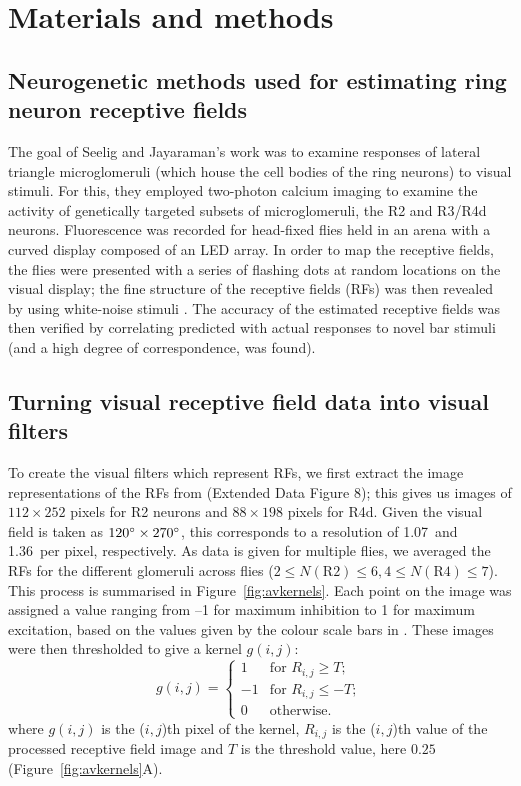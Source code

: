\section*{Materials and methods}
\subsection*{Neurogenetic methods used for estimating ring neuron receptive fields}
\label{sec:methods:seelig}
The goal of Seelig and Jayaraman's \cite{Seelig2013} work was to examine responses of lateral triangle microglomeruli (which house the cell bodies of the ring neurons) to visual stimuli.
For this, they employed two-photon calcium imaging to examine the activity of genetically targeted subsets of microglomeruli, the R2 and R3/R4d neurons.
Fluorescence was recorded for head-fixed flies held in an arena with a curved display composed of an LED array.
In order to map the receptive fields, the flies were presented with a series of flashing dots at random locations on the visual display; the fine structure of the receptive fields (RFs) was then revealed by using white-noise stimuli \cite{Weber2010}.
The accuracy of the estimated receptive fields was then verified by correlating predicted with actual responses to novel bar stimuli (and a high degree of correspondence, was found).

\subsection*{Turning visual receptive field data into visual filters}
\label{sec:methods:preprocessing}
To create the visual filters which represent RFs, we first extract the image representations of the RFs from \cite{Seelig2013} (Extended Data Figure 8); this gives us images of $112\times 252$ pixels for R2 neurons and $88\times 198$ pixels for R4d.
Given the visual field is taken as $120\degree\times 270\degree$, this corresponds to a resolution of 1.07\degree\ and 1.36\degree\ per pixel, respectively.
As data is given for multiple flies, we averaged the RFs for the different glomeruli across flies ($2\le N(\mathrm{R2}) \le 6, 4\le N(\mathrm{R4})\le 7$). This process is summarised in Figure~\ref{fig:avkernels}. Each point on the image was assigned a value ranging from --1 for maximum inhibition to 1 for maximum excitation, based on the values given by the colour scale bars in \cite{Seelig2013}.
These images were then thresholded to give a kernel $g(i,j)$:
$$
g(i,j) = \left\{ \begin{array}{rl}
1 & \mbox{for } R_{i,j} \ge T; \\
-1 & \mbox{for } R_{i,j} \le -T; \\
0 & \mbox{otherwise.}
\end{array}
\right.
$$
where $g(i,j)$ is the ($i,j$)th pixel of the kernel, $R_{i,j}$ is the ($i,j$)th value of the processed receptive field image and $T$ is the threshold value, here $0.25$ (Figure~\ref{fig:avkernels}A).

